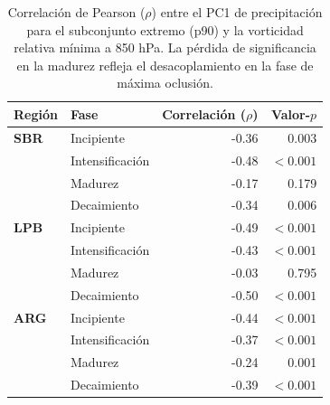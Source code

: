 \begin{table}[htbp]
\centering
\caption[Correlación de Pearson entre PC1 y vorticidad - p90]{Correlación de Pearson ($\rho$) entre el PC1 de precipitación para el subconjunto extremo (p90) y la vorticidad relativa mínima a 850 hPa. La pérdida de significancia en la madurez refleja el desacoplamiento en la fase de máxima oclusión.}
\label{tab:corr_p90_tp}
\begin{tabular*}{\textwidth}{@{\extracolsep{\fill}}llrr}
\hline
\textbf{Región} & \textbf{Fase} & \textbf{Correlación ($\rho$)} & \textbf{Valor-$p$} \\
\hline
\textbf{SBR} & Incipiente & -0.36 & 0.003 \\
 & Intensificación & -0.48 & $<0.001$ \\
 & Madurez & -0.17 & 0.179 \\
 & Decaimiento & -0.34 & 0.006 \\
\hline
\textbf{LPB} & Incipiente & -0.49 & $<0.001$ \\
 & Intensificación & -0.43 & $<0.001$ \\
 & Madurez & -0.03 & 0.795 \\
 & Decaimiento & -0.50 & $<0.001$ \\
\hline
\textbf{ARG} & Incipiente & -0.44 & $<0.001$ \\
 & Intensificación & -0.37 & $<0.001$ \\
 & Madurez & -0.24 & 0.001 \\
 & Decaimiento & -0.39 & $<0.001$ \\
\hline
\end{tabular*}
\end{table}